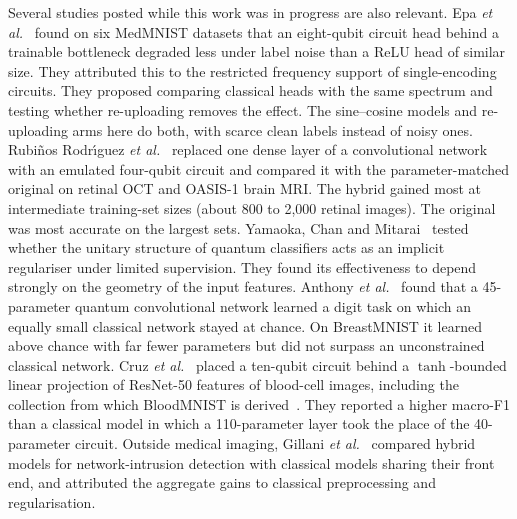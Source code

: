 \documentclass{ieeeaccess}
\begin{document}
Several studies posted while this work was in progress are also relevant. Epa \emph{et al.}~\cite{epa2026} found on six MedMNIST datasets that an eight-qubit circuit head behind a trainable bottleneck degraded less under label noise than a ReLU head of similar size. They attributed this to the restricted frequency support of single-encoding circuits. They proposed comparing classical heads with the same spectrum and testing whether re-uploading removes the effect. The sine--cosine models and re-uploading arms here do both, with scarce clean labels instead of noisy ones. Rubi\~nos Rodr\'{\i}guez \emph{et al.}~\cite{rubinos2026} replaced one dense layer of a convolutional network with an emulated four-qubit circuit and compared it with the parameter-matched original on retinal OCT and OASIS-1 brain MRI. The hybrid gained most at intermediate training-set sizes (about 800 to 2,000 retinal images). The original was most accurate on the largest sets. Yamaoka, Chan and Mitarai~\cite{yamaoka2026} tested whether the unitary structure of quantum classifiers acts as an implicit regulariser under limited supervision. They found its effectiveness to depend strongly on the geometry of the input features. Anthony \emph{et al.}~\cite{anthony2026} found that a 45-parameter quantum convolutional network learned a digit task on which an equally small classical network stayed at chance. On BreastMNIST it learned above chance with far fewer parameters but did not surpass an unconstrained classical network. Cruz \emph{et al.}~\cite{cruz2026} placed a ten-qubit circuit behind a $\tanh$-bounded linear projection of ResNet-50 features of blood-cell images, including the collection from which BloodMNIST is derived~\cite{acevedo2020}. They reported a higher macro-F1 than a classical model in which a 110-parameter layer took the place of the 40-parameter circuit. Outside medical imaging, Gillani \emph{et al.}~\cite{gillani2026} compared hybrid models for network-intrusion detection with classical models sharing their front end, and attributed the aggregate gains to classical preprocessing and regularisation.
\end{document}
